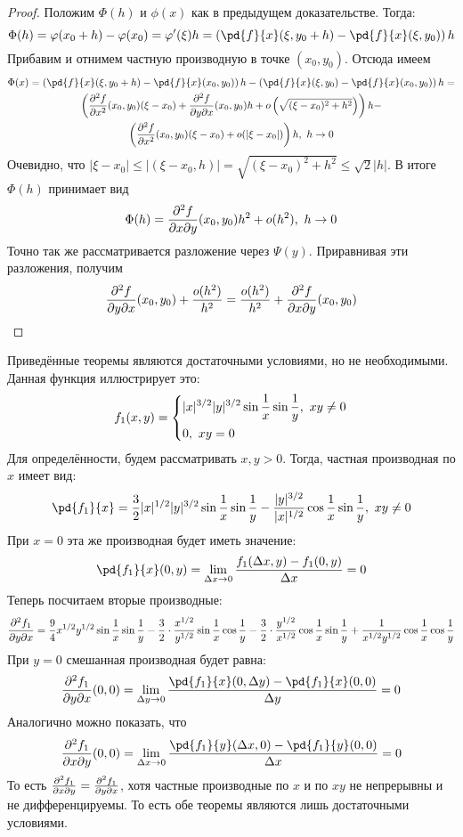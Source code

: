 \begin{proof}
	Положим $\Phi(h)$ и $\phi(x)$ как в предыдущем доказательстве. Тогда:
	\[
		\Phi(h) = \phi(x_0 + h) - \phi(x_0) = \phi'(\xi) h = \left(\pd{f}{x} (\xi, y_0 + h) - \pd{f}{x} (\xi, y_0)\right) h
	\]
	Прибавим и отнимем частную производную в точке $(x_0, y_0)$. Отсюда имеем
	\begin{multline*}
		\Phi(x) = \left(\pd{f}{x} (\xi, y_0 + h) - \pd{f}{x} (x_0, y_0)\right) h - \left(\pd{f}{x} (\xi, y_0) - \pd{f}{x} (x_0, y_0)\right) h =
		\\
		\left(\frac{\vdelta^2 f}{\vdelta x^2} (x_0, y_0) (\xi - x_0) + \frac{\vdelta^2 f}{\vdelta y \vdelta x} (x_0, y_0) h + o\left(\sqrt{(\xi - x_0)^2 + h^2}\right)\right) h -
		\\
		\left(\frac{\vdelta^2 f}{\vdelta x^2} (x_0, y_0) (\xi - x_0) + o(|\xi - x_0|)\right) h,\ h\to 0
	\end{multline*}
	Очевидно, что $|\xi - x_0| \leq |(\xi - x_0, h)| = \sqrt{(\xi - x_0)^2 + h^2} \leq \sqrt{2}|h|$.
	В итоге $\Phi(h)$ принимает вид
	\[
		\Phi(h) = \frac{\partial^2 f}{\partial x \partial y} (x_0, y_0) h^2 + o(h^2),\ h\to 0
	\]
	Точно так же рассматривается разложение через $\Psi(y)$. Приравнивая эти разложения, получим
	\[
		\frac{\partial^2 f}{\partial y \partial x} (x_0, y_0) + \frac{o(h^2)}{h^2} = \frac{o(h^2)}{h^2} + \frac{\partial^2 f}{\partial x \partial y} (x_0, y_0)
	\]
\end{proof}

\begin{example}
	Приведённые теоремы являются достаточными условиями, но не необходимыми. Данная функция иллюстрирует это:
	\[
		f_1(x, y) = \left\{\begin{aligned}
			&{|x|^{3/2} |y|^{3/2} \sin \frac{1}{x} \sin \frac{1}{y},\ xy \neq 0}
			\\
			&{0,\ xy = 0}
		\end{aligned}\right.
	\]
	Для определённости, будем рассматривать $x, y > 0$. Тогда, частная производная по $x$ имеет вид:
	\[
		\pd{f_1}{x} = \frac{3}{2} |x|^{1/2} |y|^{3/2} \sin \frac{1}{x} \sin \frac{1}{y} - \frac{|y|^{3/2}}{|x|^{1/2}} \cos \frac{1}{x} \sin \frac{1}{y},\ xy \neq 0
	\]
	При $x = 0$ эта же производная будет иметь значение:
	\[
		\pd{f_1}{x} (0, y) = \liml_{\Delta x \to 0} \frac{f_1(\Delta x, y) - f_1(0, y)}{\Delta x} = 0
	\]
	Теперь посчитаем вторые производные:
	\[
		\frac{\partial^2 f_1}{\partial y \partial x} = \frac{9}{4} x^{1/2} y^{1/2} \sin \frac{1}{x} \sin \frac{1}{y} - \frac{3}{2} \cdot \frac{x^{1/2}}{y^{1/2}} \sin \frac{1}{x} \cos \frac{1}{y} - \frac{3}{2} \cdot \frac{y^{1/2}}{x^{1/2}} \cos \frac{1}{x} \sin \frac{1}{y} + \frac{1}{x^{1/2} y^{1/2}} \cos \frac{1}{x} \cos \frac{1}{y} 
	\]
	При $y = 0$ смешанная производная будет равна:
	\[
		\frac{\vdelta^2 f_1}{\vdelta y \vdelta x}(0, 0) = \liml_{\Delta y \to 0}\frac{\pd{f_1}{x}(0, \Delta y) - \pd{f_1}{x}(0, 0)}{\Delta y} = 0
	\]
	Аналогично можно показать, что 
	\[
		\frac{\vdelta^2 f_1}{\vdelta x \vdelta y}(0, 0) = \liml_{\Delta x \to 0}\frac{\pd{f_1}{y}(\Delta x, 0) - \pd{f_1}{y}(0, 0)}{\Delta x} = 0
	\]
	То есть $\frac{\partial^2 f_1}{\partial x \partial y} = \frac{\partial^2 f_1}{\partial y \partial x}$, хотя частные производные по $x$ и по $xy$  не непрерывны и не дифференцируемы. То есть обе теоремы являются лишь достаточными условиями.
\end{example}

